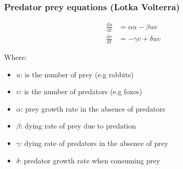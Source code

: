 \documentclass[xcolor=table]{beamer}
\begin{document}
\begin{frame}[fragile]
\frametitle{Predator prey equations (Lotka Volterra)}


\begin{align*}
    \frac{\mathrm{d} u}{\mathrm{d} t} &= \alpha u - \beta uv\\[1em]
\frac{\mathrm{d} v}{\mathrm{d} t} &= -\gamma v + \delta uv 
\end{align*}





Where:

\begin{itemize}
\item $u$: is the number of prey (e.g rabbits)
\item $v$: is the number of predators (e.g foxes)
\item $\alpha$: prey growth rate in the absence of predators
\item $\beta$: dying rate of prey due to predation
\item $\gamma$: dying rate of predators in the absence of prey
\item $\delta$: predator growth rate when consuming prey
\end{itemize}


\end{frame}
\end{document}
